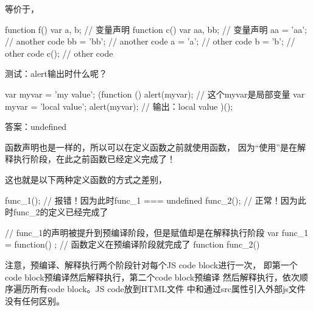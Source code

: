 等价于，

\begin{javascriptcode}
  function f() {
    var a, b; // 变量声明
    function c() {
      var aa, bb; // 变量声明
      aa = 'aa';
      // another code
      bb = 'bb';
      // another code
    }
    a = 'a';
    // other code
    b = 'b';
    // other code
    c();
    // other code
  }
\end{javascriptcode}

测试：alert输出时什么呢？

\begin{javascriptcode}
  var myvar = 'my value';
  (function () {
    alert(myvar); // 这个myvar是局部变量
    var myvar = 'local value';
    alert(myvar); // 输出：local value
  })();
\end{javascriptcode}

答案：undefined

函数声明也是一样的，所以可以在定义函数之前就使用函数，
因为“使用”是在解释执行阶段，在此之前函数已经定义完成了！

这也就是以下两种定义函数的方式之差别，

\begin{javascriptcode}
func_1(); // 报错！因为此时func_1 === undefined
func_2(); // 正常！因为此时func_2的定义已经完成了

// func_1的声明被提升到预编译阶段，但是赋值却是在解释执行阶段
var func_1 = function() { };
// 函数定义在预编译阶段就完成了
function func_2() { }
\end{javascriptcode}

注意，预编译、解释执行两个阶段针对每个JS code block进行一次，
即第一个code block预编译然后解释执行，第二个code block预编译
然后解释执行，依次顺序遍历所有code block。JS code放到HTML文件
中和通过src属性引入外部js文件没有任何区别。